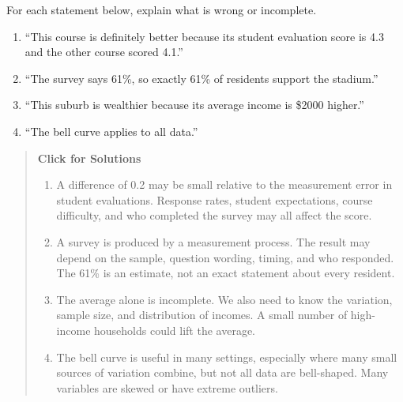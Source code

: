 \documentclass[
  letterpaper,
  DIV=11,
  numbers=noendperiod]{scrreprt}
\begin{document}
\begin{tcolorbox}[enhanced jigsaw, arc=.35mm, bottomrule=.15mm, bottomtitle=1mm, breakable, colback=white, colbacktitle=quarto-callout-note-color!10!white, colframe=quarto-callout-note-color-frame, coltitle=black, left=2mm, leftrule=.75mm, opacityback=0, opacitybacktitle=0.6, rightrule=.15mm, title=\textcolor{quarto-callout-note-color}{\faInfo}\hspace{0.5em}{Question 10}, titlerule=0mm, toprule=.15mm, toptitle=1mm]

For each statement below, explain what is wrong or incomplete.

\begin{enumerate}
\def\labelenumi{\alph{enumi}.}
\item
  ``This course is definitely better because its student evaluation
  score is 4.3 and the other course scored 4.1.''
\item
  ``The survey says 61\%, so exactly 61\% of residents support the
  stadium.''
\item
  ``This suburb is wealthier because its average income is \$2000
  higher.''
\item
  ``The bell curve applies to all data.''
\end{enumerate}

\begin{quote}
\textbf{Click for Solutions}

\begin{enumerate}
\def\labelenumi{\alph{enumi}.}
\item
  A difference of 0.2 may be small relative to the measurement error in
  student evaluations. Response rates, student expectations, course
  difficulty, and who completed the survey may all affect the score.
\item
  A survey is produced by a measurement process. The result may depend
  on the sample, question wording, timing, and who responded. The 61\%
  is an estimate, not an exact statement about every resident.
\item
  The average alone is incomplete. We also need to know the variation,
  sample size, and distribution of incomes. A small number of
  high-income households could lift the average.
\item
  The bell curve is useful in many settings, especially where many small
  sources of variation combine, but not all data are bell-shaped. Many
  variables are skewed or have extreme outliers.
\end{enumerate}
\end{quote}

\end{tcolorbox}
\end{document}

